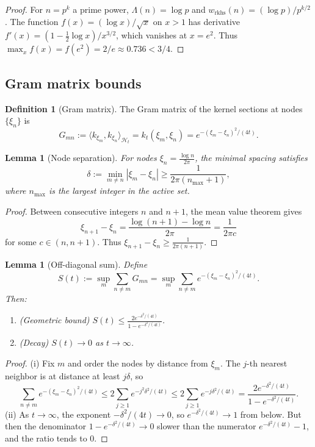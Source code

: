 \documentclass[11pt,a4paper]{article}
\newtheorem{lemma}[theorem]{Lemma}
\theoremstyle{definition}
\newtheorem{definition}[theorem]{Definition}
\theoremstyle{remark}
\begin{document}
\begin{proof}
For $n = p^k$ a prime power, $\Lambda(n) = \log p$ and $w_{\mathrm{rkhs}}(n) = (\log p)/p^{k/2}$. The function $f(x) = (\log x)/\sqrt{x}$ on $x > 1$ has derivative $f'(x) = (1 - \frac{1}{2}\log x)/x^{3/2}$, which vanishes at $x = e^2$. Thus $\max_x f(x) = f(e^2) = 2/e \approx 0.736 < 3/4$.
\end{proof}

\subsection{Gram matrix bounds}

\begin{definition}[Gram matrix]
The Gram matrix of the kernel sections at nodes $\{\xi_n\}$ is
\[
  G_{mn} := \langle k_{\xi_m}, k_{\xi_n} \rangle_{\mathcal{H}_t} = k_t(\xi_m, \xi_n) = e^{-(\xi_m - \xi_n)^2/(4t)}.
\]
\end{definition}

\begin{lemma}[Node separation]\label{lem:node-sep}
For nodes $\xi_n = \frac{\log n}{2\pi}$, the minimal spacing satisfies
\[
  \delta := \min_{m \neq n} |\xi_m - \xi_n| \geq \frac{1}{2\pi(n_{\max} + 1)},
\]
where $n_{\max}$ is the largest integer in the active set.
\end{lemma}

\begin{proof}
Between consecutive integers $n$ and $n+1$, the mean value theorem gives
\[
  \xi_{n+1} - \xi_n = \frac{\log(n+1) - \log n}{2\pi} = \frac{1}{2\pi c}
\]
for some $c \in (n, n+1)$. Thus $\xi_{n+1} - \xi_n \geq \frac{1}{2\pi(n+1)}$.
\end{proof}

\begin{lemma}[Off-diagonal sum]\label{lem:off-diag}
Define
\[
  S(t) := \sup_m \sum_{n \neq m} G_{mn} = \sup_m \sum_{n \neq m} e^{-(\xi_m - \xi_n)^2/(4t)}.
\]
Then:
\begin{enumerate}[label=(\roman*)]
\item (Geometric bound) $S(t) \leq \frac{2e^{-\delta^2/(4t)}}{1 - e^{-\delta^2/(4t)}}$.
\item (Decay) $S(t) \to 0$ as $t \to \infty$.
\end{enumerate}
\end{lemma}

\begin{proof}
(i) Fix $m$ and order the nodes by distance from $\xi_m$. The $j$-th nearest neighbor is at distance at least $j \delta$, so
\[
  \sum_{n \neq m} e^{-(\xi_m - \xi_n)^2/(4t)} \leq 2 \sum_{j \geq 1} e^{-j^2 \delta^2/(4t)}
  \leq 2 \sum_{j \geq 1} e^{-j \delta^2/(4t)} = \frac{2e^{-\delta^2/(4t)}}{1 - e^{-\delta^2/(4t)}}.
\]
(ii) As $t \to \infty$, the exponent $-\delta^2/(4t) \to 0$, so $e^{-\delta^2/(4t)} \to 1$ from below. But then the denominator $1 - e^{-\delta^2/(4t)} \to 0$ slower than the numerator $e^{-\delta^2/(4t)} - 1$, and the ratio tends to $0$.
\end{proof}
\end{document}
